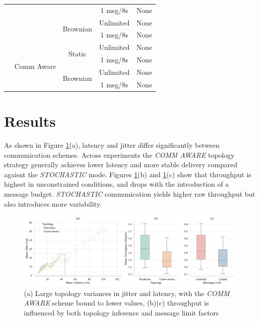 \documentclass[conference]{IEEEtran}
\begin{document}
\begin{table}[ht]
\begin{tabular}{c|c|c|c|c}
  &   &          & 1 msg/8s & None \\
  \cmidrule{4-5}
  &   & \multirow{2}{*}{Brownian}
                 & Unlimited& None \\
  &   &          & 1 msg/8s & None \\
  \cmidrule{2-5}
  & \multirow{5}{*}{Comm Aware}
    & \multirow{2}{*}{Static}
                 & Unlimited& None \\
  &   &          & 1 msg/8s & None \\
  \cmidrule{4-5}
  &   & \multirow{2}{*}{Brownian}
                 & Unlimited& None \\
  &   &          & 1 msg/8s & None \\
\bottomrule
\end{tabular}
\end{table}

\section{Results}

As shown in Figure \ref{fig:topology}(a), latency and jitter differ significantly between communication schemes. Across experiments 
the \emph{COMM AWARE} topology strategy generally achieves lower latency and more stable delivery compared agaisnt the \emph{STOCHASTIC} mode. Figures \ref{fig:topology}(b) and \ref{fig:topology}(c) show that throughput is highest in unconstrained conditions, and drops with the introduction of a message budget. \emph{STOCHASTIC} communication yields higher raw throughput but also introduces more variability.

\begin{figure}[h]
    \centering
    \includegraphics[width=1\textwidth]{topology_impact.pdf}
    \caption{(a) Large topology variances in jitter and latency, with the \emph{COMM AWARE} scheme bound to lower values, (b)(c) throughput is influenced by both topology inference and message limit factors}
    \label{fig:topology}
\end{figure}
\end{document}
